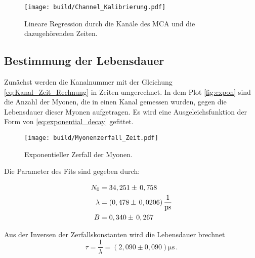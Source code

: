 \begin{figure}[H]
    \centering
    \texttt{[image: build/Channel\_Kalibrierung.pdf]}
    \caption{Lineare Regression durch die Kanäle des MCA und die dazugehörenden Zeiten.}
    \label{fig:lin_reg_Channel_zeit}
\end{figure}

\subsection{Bestimmung der Lebensdauer}
\label{sec:Bes_Leb}

Zunächst werden die Kanalnummer mit der Gleichung \autoref{eq:Kanal_Zeit_Rechnung} in Zeiten umgerechnet.
In dem Plot \autoref{fig:expon} sind die Anzahl der Myonen, die in einen Kanal gemessen wurden, gegen die Lebensdauer dieser Myonen aufgetragen.
Es wird eine Ausgeleichsfunktion der Form von \autoref{eq:exponential_decay} gefittet.

\begin{figure}[H]
    \centering
    \texttt{[image: build/Myonenzerfall\_Zeit.pdf]}
    \caption{Exponentieller Zerfall der Myonen.}
    \label{fig:expon}
\end{figure}

Die Parameter des Fits sind gegeben durch:

\begin{align*}
    N_0         &=34,251  \pm \, 0,758                                 \\
    \lambda     &= (0,478 \pm \, 0,0206)  \, \unit{\dfrac{1}{\micro\second}} \\
    B           &=0,340   \pm \, 0,267
\end{align*}

Aus der Inversen der Zerfallskonstanten wird die Lebensdauer brechnet
\begin{equation*}
    \tau = \dfrac{1}{\lambda} = \left(2,090  \pm 0,090 \right) \unit{\micro\second}\,.
\end{equation*}
